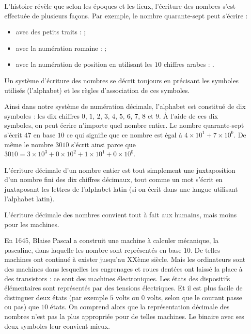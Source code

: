 \documentclass[class=report,crop=false]{standalone}
\begin{document}
L'histoire révèle que selon les époques et les lieux, l'écriture des
nombres s'est effectuée de plusieurs façons. Par exemple, le nombre
quarante-sept peut s'écrire :

\begin{itemize}
\item avec des petits traits :
\textbar{}\textbar{}\textbar{}\textbar{}\textbar{} \textbar{}\textbar{}\textbar{}\textbar{}\textbar{} \textbar{}\textbar{}\textbar{}\textbar{}\textbar{} \textbar{}\textbar{}\textbar{}\textbar{}\textbar{} \textbar{}\textbar{}\textbar{}\textbar{}\textbar{} \textbar{}\textbar{}\textbar{}\textbar{}\textbar{} \textbar{}\textbar{}\textbar{}\textbar{}\textbar{} \textbar{}\textbar{}\textbar{}\textbar{}\textbar{} \textbar{}\textbar{}\textbar{}\textbar{}\textbar{} \textbar{}\textbar{} ;
\item avec la numération romaine :  ;
\item avec la numération de position en utilisant les $10$ chiffres arabes :
  .
\end{itemize}

Un système d'écriture des nombres se décrit toujours en précisant les
symboles utilisés (l'alphabet) et les règles d'association de ces
symboles.

Ainsi dans notre système de numération décimale, l'alphabet est
constitué de dix symboles : les dix chiffres $0$, $1$, $2$, $3$, $4$, $5$, $6$, $7$, $8$
et $9$. À l'aide de ces dix symboles, on peut écrire n'importe quel nombre
entier. Le nombre quarante-sept s'écrit $47$ en base $10$ ce qui signifie
que ce nombre est égal à $4\times 10^1 + 7\times 10^0$. De même le
nombre $3010$ s'écrit ainsi parce que
$3010 = 3\times 10^3 + 0\times 10^2 + 1\times 10^1 + 0\times 10^0$.

L'écriture décimale d'un nombre entier est tout simplement une
juxtaposition d'un nombre fini des dix chiffres décimaux, tout comme un
mot s'écrit en juxtaposant les lettres de l'alphabet latin (si on écrit
dans une langue utilisant l'alphabet latin).

L'écriture décimale des nombres convient tout à fait aux humains, mais
moins pour les machines.



En 1645, Blaise Pascal a construit une machine à calculer mécanique, la
pascaline, dans laquelle les nombre sont représentés en base $10$. De
telles machines ont continué à exister jusqu'au XXème siècle.
Mais les ordinateurs sont des machines dans lesquelles les engrenages et
roues dentées ont laissé la place à des transistors : ce sont des
machines électroniques. Les états des dispositifs élémentaires sont
représentés par des tensions électriques. Et il est plus facile de
distinguer deux états (par exemple $5$ volts ou $0$ volts, selon que le courant passe ou pas) 
que $10$ états. On comprend
alors que la représentation décimale des nombres n'est pas la plus
appropriée pour de telles machines. Le binaire avec ses deux symboles
leur convient mieux.
\end{document}

